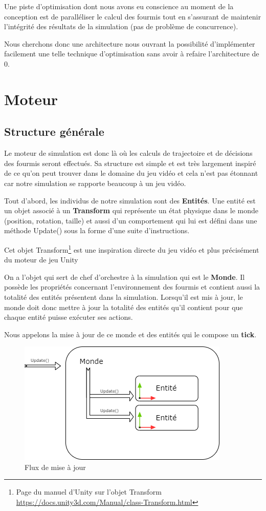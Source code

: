 \documentclass{EPUProjetDi}
\begin{document}
Une piste d'optimisation dont nous avons eu conscience au moment de la conception est de paralléliser le calcul des fourmis tout en s'assurant de maintenir
l'intégrité des résultats de la simulation (pas de problème de concurrence).

Nous cherchons donc une architecture nous ouvrant la possibilité d'implémenter facilement une telle technique d'optimisation sans avoir à
refaire l'architecture de 0. 

\pagebreak

\section{Moteur}

\subsection{Structure générale}

Le moteur de simulation est donc là où les calculs de trajectoire et de décisions des fourmis seront effectués.
Sa structure est simple et est très largement inspiré de ce qu'on peut trouver dans le domaine du jeu vidéo et 
cela n'est pas étonnant car notre simulation se rapporte beaucoup à un jeu vidéo.

Tout d'abord, les individus de notre simulation sont des \textbf{Entités}. Une entité est un objet associé à un
\textbf{Transform} qui représente un état physique dans le monde (position, rotation, taille) et aussi d'un comportement
qui lui est défini dans une méthode Update() sous la forme d'une suite d'instructions.

Cet objet Transform\footnote{Page du manuel d'Unity sur l'objet Transform \url{https://docs.unity3d.com/Manual/class-Transform.html}} 
est une inspiration directe du jeu vidéo et plus précisément du moteur de jeu Unity

On a l'objet qui sert de chef d'orchestre à la simulation qui est le \textbf{Monde}. Il possède les propriétés concernant 
l'environnement des fourmis et contient aussi la totalité des entités présentent dans la simulation.
Lorsqu'il est mis à jour, le monde doit donc mettre à jour la totalité des entités qu'il contient pour que chaque entité 
puisse exécuter ses actions.

Nous appelons la mise à jour de ce monde et des entités qui le compose un \textbf{tick}.

\begin{figure}[h]
    \centering
    \includegraphics[scale=0.8]{moteur_structuregenerale.png}
    \caption{Flux de mise à jour}
    \label{fig:flow_update}
\end{figure}
\end{document}
